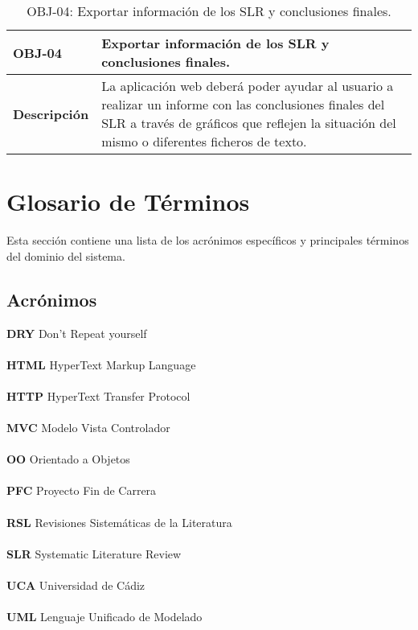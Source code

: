 \begin{table}[!hbt]
	\begin{center}
		\begin{tabular}{|p{2cm}|p{13cm}|}
			\hline
			\textbf{OBJ-04} & Exportar información de los SLR y conclusiones finales.\\
			\hline
			\textbf{Descripción} & La aplicación web deberá poder ayudar al usuario a realizar un informe con las conclusiones finales del SLR a través de gráficos que reflejen la situación del mismo o diferentes ficheros de texto.\\
			\hline
		\end{tabular}
		\caption{OBJ-04: Exportar información de los SLR y conclusiones finales.}
		\label{table:obj04}
	\end{center}
\end{table}

\section{Glosario de Términos} 
Esta sección contiene una lista de los acrónimos específicos y principales términos del dominio del sistema.\\

\subsection{Acrónimos}
\textbf{DRY}	Don't Repeat yourself\\\\
\textbf{HTML}	HyperText Markup Language\\\\
\textbf{HTTP}	HyperText Transfer Protocol\\\\
\textbf{MVC}	Modelo Vista Controlador\\\\
\textbf{OO}	Orientado a Objetos\\\\
\textbf{PFC}	Proyecto Fin de Carrera\\\\
\textbf{RSL}	Revisiones Sistemáticas de la Literatura\\\\
\textbf{SLR}	Systematic Literature Review\\\\
\textbf{UCA}	Universidad de Cádiz\\\\
\textbf{UML}	Lenguaje Unificado de Modelado\\\\

